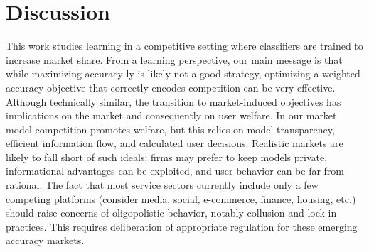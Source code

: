 \section{Discussion}
This work studies learning in a competitive setting where 
classifiers are trained to increase market share.
From a learning perspective, our main message is that
while maximizing accuracy {\naive}ly is likely not a good strategy,
optimizing a weighted accuracy objective that correctly encodes competition
can be very effective.
Although technically similar, the transition to market-induced objectives
has implications on the market and consequently on user welfare.
In our market model competition promotes welfare,
but this relies on model transparency, efficient information flow,
and calculated user decisions.
Realistic markets are likely to fall short of such ideals:
firms may prefer to keep models private,
informational advantages can be exploited,
and user behavior can be far from rational.
The fact that most service sectors currently include only a few competing platforms
(consider media, social, e-commerce, finance, housing, etc.)
should raise concerns of oligopolistic behavior, notably collusion and lock-in practices. 
This requires deliberation of appropriate regulation
for these emerging accuracy markets.
\squeeze


